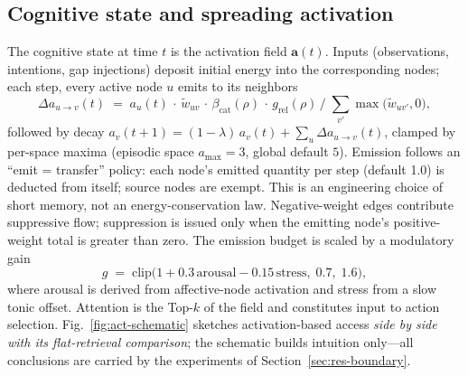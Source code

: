 \documentclass[10pt,a4paper]{article}
\begin{document}
\subsection{Cognitive state and spreading activation}
\label{sec:arch-act}
The cognitive state at time $t$ is the activation field $\mathbf{a}(t)$. Inputs (observations, intentions, gap injections) deposit initial energy into the corresponding nodes; each step, every active node $u$ emits to its neighbors
\begin{equation}
\Delta a_{u\rightarrow v}(t) \;=\; a_u(t)\,\cdot\, \tilde w_{uv}\,\cdot\, \beta_{\mathrm{cat}}(\rho)\,\cdot\, g_{\mathrm{rel}}(\rho)\,\Big/\; \textstyle\sum_{v'} \max\big(\tilde w_{uv'},0\big),
\label{eq:spread}
\end{equation}
followed by decay $a_v(t{+}1) = (1-\lambda)\,a_v(t) + \sum_u \Delta a_{u\rightarrow v}(t)$, clamped by per-space maxima (episodic space $a_{\max}{=}3$, global default $5$). Emission follows an ``emit = transfer'' policy: each node's emitted quantity per step (default 1.0) is deducted from itself; source nodes are exempt. This is an engineering choice of short memory, not an energy-conservation law. Negative-weight edges contribute suppressive flow; suppression is issued only when the emitting node's positive-weight total is greater than zero. The emission budget is scaled by a modulatory gain
\begin{equation}
g \;=\; \mathrm{clip}\big(1 + 0.3\,\mathrm{arousal} - 0.15\,\mathrm{stress},\; 0.7,\; 1.6\big),
\label{eq:mod}
\end{equation}
where arousal is derived from affective-node activation and stress from a slow tonic offset. Attention is the Top-$k$ of the field and constitutes input to action selection. Fig.~\ref{fig:act-schematic} sketches activation-based access \emph{side by side with its flat-retrieval comparison}; the schematic builds intuition only---all conclusions are carried by the experiments of Section~\ref{sec:res-boundary}.
\end{document}
